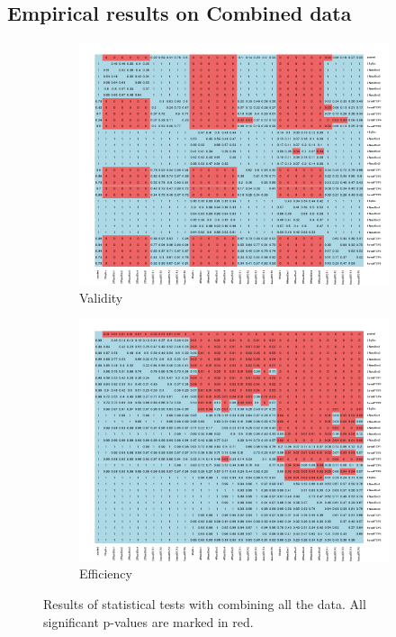 \documentclass[main]{subfiles}
\begin{document}
\newpage

\subsection{Empirical results on Combined data}

\begin{figure}[!h]
\centering
\begin{subfigure}{.5\textwidth}
  \centering
  \includegraphics[width=\linewidth]{images/heatmapCombined}
  \caption{Validity}
  \label{fig:valCombined}
\end{subfigure}%
\begin{subfigure}{.5\textwidth}
  \centering
  \includegraphics[width=\linewidth]{images/heatmapCombined_eff}
  \caption{Efficiency}
  \label{fig:effCombined}
\end{subfigure}%
\caption{Results of statistical tests with combining all the data. All significant p-values are marked in red.} \label{fig:testCombined}
\end{figure}

 









 
\end{document}
